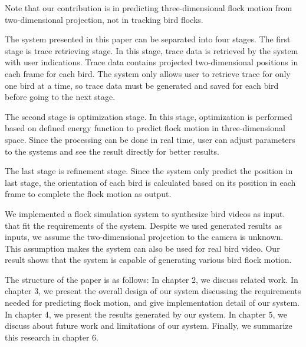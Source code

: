 Note that our contribution is in predicting three-dimensional flock motion from two-dimensional projection, not in tracking bird flocks.


The system presented in this paper can be separated into four stages. The first stage is trace retrieving stage. In this stage, trace data is retrieved by the system with user indications. Trace data contains projected two-dimensional positions in each frame for each bird. The system only allows user to retrieve trace for only one bird at a time, so trace data must be generated and saved for each bird before going to the next stage.


The second stage is optimization stage. In this stage, optimization is performed based on defined energy function to predict flock motion in three-dimensional space. Since the processing can be done in real time, user can adjust parameters to the systems and see the result directly for better results.


The last stage is refinement stage. Since the system only predict the position in last stage, the orientation of each bird is calculated based on its position in each frame to complete the flock motion as output.


We implemented a flock simulation system to synthesize bird videos as input. that fit the requirements of the system. Despite we used generated results as inputs, we assume the two-dimensional projection to the camera is unknown. This assumption makes the system can also be used for real bird video. Our result shows that the system is capable of generating various bird flock motion.


The structure of the paper is as follows: In chapter 2, we discuss related work. In chapter 3, we present the overall design of our system discussing the requirements needed for predicting flock motion, and give implementation detail of our system. In chapter 4, we present the results generated by our system. In chapter 5, we discuss about future work and limitations of our system. Finally, we summarize this research in chapter 6.


